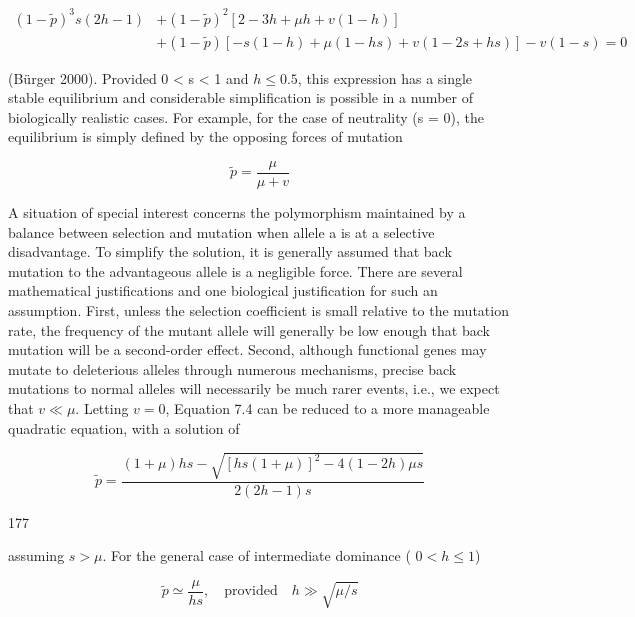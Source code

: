 \documentclass{article}
\begin{document}
\begin{equation}
\begin{align*}(1-\widetilde{p})^{3}s(2h-1)&+(1-\widetilde{p})^{2}[2-3h+\mu h+v(1-h)]\\&+(1-\widetilde{p})[-s(1-h)+\mu(1-hs)+v(1-2s+hs)]-v(1-s)=0\end{align*}
\tag{7.4}
\label{eq:7_4}
\end{equation}

(Bürger 2000). Provided 0 < s < 1 and  $ h \leq 0.5 $, this expression has a single stable equilibrium and considerable simplification is possible in a number of biologically realistic cases. For example, for the case of neutrality (s = 0), the equilibrium is simply defined by the opposing forces of mutation

\begin{equation}
\widetilde{p}=\frac{\mu}{\mu+v}
\tag{7.5}
\label{eq:7_5}
\end{equation}

A situation of special interest concerns the polymorphism maintained by a balance between selection and mutation when allele a is at a selective disadvantage. To simplify the solution, it is generally assumed that back mutation to the advantageous allele is a negligible force. There are several mathematical justifications and one biological justification for such an assumption. First, unless the selection coefficient is small relative to the mutation rate, the frequency of the mutant allele will generally be low enough that back mutation will be a second-order effect. Second, although functional genes may mutate to deleterious alleles through numerous mechanisms, precise back mutations to normal alleles will necessarily be much rarer events, i.e., we expect that  $ v \ll \mu $. Letting  $ v = 0 $, Equation 7.4 can be reduced to a more manageable quadratic equation, with a solution of

\begin{equation}
\widetilde{p}=\frac{(1+\mu)h s-\sqrt{[h s(1+\mu)]^{2}-4(1-2h)\mu s}}{2(2h-1)s}
\tag{7.6a}
\label{eq:7_6a}
\end{equation}

177

assuming  $ s > \mu $. For the general case of intermediate dominance ( $ 0 < h \leq 1 $)

\begin{equation}
\tilde{p}\simeq\frac{\mu}{h s},\quad\mathrm{p r o v i d e d}\quad h\gg\sqrt{\mu/s}
\tag{7.6b}
\label{eq:7_6b}
\end{equation}
\end{document}
